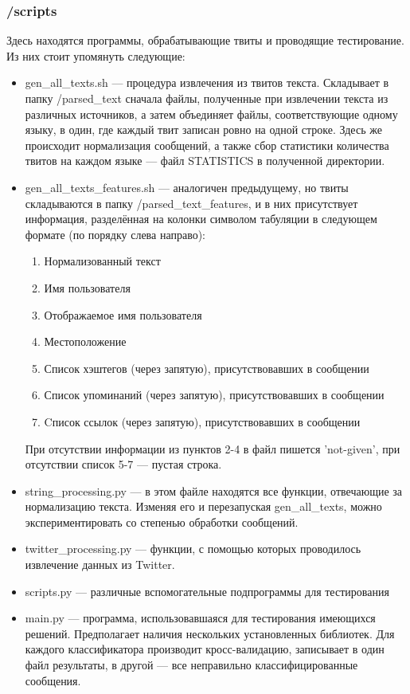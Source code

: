 \documentclass[a4paper, 14pt]{article}
\begin{document}
			\subsubsection{/scripts}
			Здесь находятся программы, обрабатывающие твиты и проводящие тестирование. Из них стоит упомянуть следующие:
			\begin{itemize}
				\item gen_all_texts.sh --- процедура извлечения из твитов текста. Складывает в папку /parsed\_text сначала файлы, полученные при извлечении текста из различных источников, а затем объединяет файлы, соответствующие одному языку, в один, где каждый твит записан ровно на одной строке. Здесь же происходит нормализация сообщений, а также сбор статистики количества твитов на каждом языке --- файл STATISTICS в полученной директории.
				\item gen_all_texts_features.sh --- аналогичен предыдущему, но твиты складываются в папку /parsed\_text\_features, и в них присутствует информация, разделённая на колонки символом табуляции в следующем формате (по порядку слева направо):
				\begin{enumerate}
					\item Нормализованный текст
					\item Имя пользователя
					\item Отображаемое имя пользователя
					\item Местоположение
					\item Список хэштегов (через запятую), присутствовавших в сообщении
					\item Список упоминаний (через запятую), присутствовавших в сообщении
					\item Cписок ссылок (через запятую), присутствовавших в сообщении
				\end{enumerate}
				При отсутствии информации из пунктов 2-4 в файл пишется 'not-given', при отсутствии список 5-7 --- пустая строка.
				\item string_processing.py --- в этом файле находятся все функции, отвечающие за нормализацию текста. Изменяя его и перезапуская gen_all_texts, можно экспериментировать со степенью обработки сообщений.
				\item twitter_processing.py --- функции, с помощью которых проводилось извлечение данных из Twitter.
				\item scripts.py --- различные вспомогательные подпрограммы для тестирования
				\item main.py --- программа, использовавшаяся для тестирования имеющихся решений. Предполагает наличия нескольких установленных библиотек. Для каждого классификатора производит кросс-валидацию, записывает в один файл результаты, в другой --- все неправильно классифицированные сообщения.
			\end{itemize}
\end{document}
